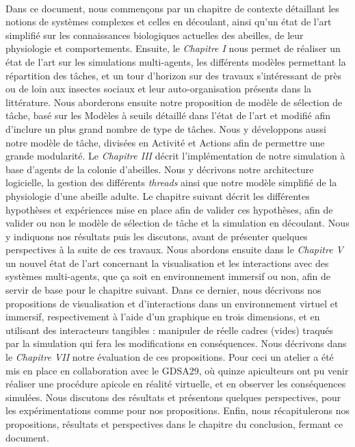 	\paragraph{}
	Dans ce document, nous commençons par un chapitre de contexte détaillant les notions de systèmes complexes et celles en découlant, ainsi qu'un état de l'art simplifié sur les connaissances biologiques actuelles des abeilles, de leur physiologie et comportements.
	 Ensuite, le \textit{Chapitre I} nous permet de réaliser un état de l'art sur les simulations multi-agents, les différents modèles permettant la répartition des tâches, et un tour d'horizon sur des travaux s'intéressant de près ou de loin aux insectes sociaux et leur auto-organisation présents dans la littérature. 
	 Nous aborderons ensuite notre proposition de modèle de sélection de tâche, basé sur les Modèles à seuils détaillé dans l'état de l'art et modifié afin d'inclure un plus grand nombre de type de tâches. Nous y développons aussi notre modèle de tâche, divisées en Activité et Actions afin de permettre une grande modularité. 
	 Le \textit{Chapitre III} décrit l'implémentation de notre simulation à base d'agents de la colonie d'abeilles. Nous y décrivons notre architecture logicielle, la gestion des différents \textit{threads} ainsi que notre modèle simplifié de la physiologie d'une abeille adulte. 
	 Le chapitre suivant décrit les différentes hypothèses et expériences mise en place afin de valider ces hypothèses, afin de valider ou non le modèle de sélection de tâche et la simulation en découlant. Nous y indiquons nos résultats puis les discutons, avant de présenter quelques perspectives à la suite de ces travaux. 
	 Nous abordons ensuite dans le \textit{Chapitre V} un nouvel état de l'art concernant la visualisation et les interactions avec des systèmes multi-agents, que ça soit en environnement immersif ou non, afin de servir de base pour le chapitre suivant. 
	 Dans ce dernier, nous décrivons nos propositions de visualisation et d'interactions dans un environnement virtuel et immersif, respectivement à l'aide d'un graphique en trois dimensions, et en utilisant des interacteurs tangibles : manipuler de réelle cadres (vides) traqués par la simulation qui fera les modifications en conséquences. 
	 Nous décrivons dans le \textit{Chapitre VII} notre évaluation de ces propositions. Pour ceci un atelier a été mis en place en collaboration avec le GDSA29, où quinze apiculteurs ont pu venir réaliser une procédure apicole en réalité virtuelle, et en observer les conséquences simulées. Nous discutons des résultats et présentons quelques perspectives, pour les expérimentations comme pour nos propositions. 
	 Enfin, nous récapitulerons nos propositions, résultats et perspectives dans le chapitre du conclusion, fermant ce document.